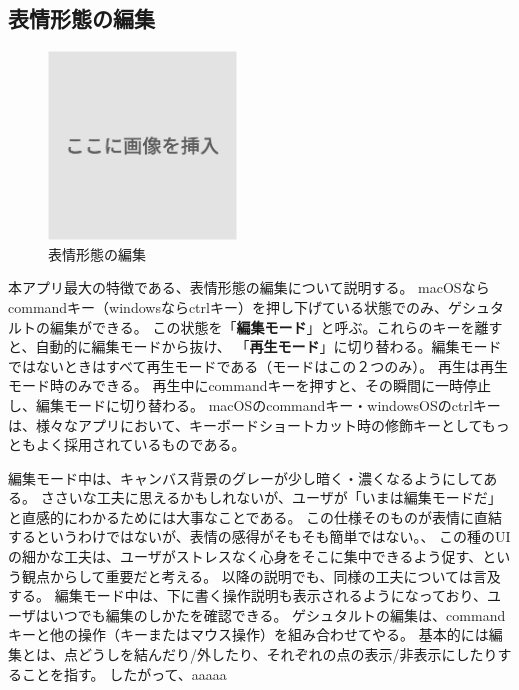 \subsection{表情形態の編集}
\begin{figure}[h]
  \centering
  \includegraphics[width=5cm]{images/dummy.png}
  \caption{表情形態の編集}
  \label{fig:表情形態の編集}
\end{figure}
本アプリ最大の特徴である、表情形態の編集について説明する。
macOSならcommandキー（windowsならctrlキー）を押し下げている状態でのみ、ゲシュタルトの編集ができる。
この状態を「\textbf{編集モード}」と呼ぶ。これらのキーを離すと、自動的に編集モードから抜け、
「\textbf{再生モード}」に切り替わる。編集モードではないときはすべて再生モードである（モードはこの２つのみ）。
再生は再生モード時のみできる。
再生中にcommandキーを押すと、その瞬間に一時停止し、編集モードに切り替わる。
macOSのcommandキー・windowsOSのctrlキーは、様々なアプリにおいて、キーボードショートカット時の修飾キーとしてもっともよく採用されているものである。

編集モード中は、キャンバス背景のグレーが少し暗く・濃くなるようにしてある。
ささいな工夫に思えるかもしれないが、ユーザが「いまは編集モードだ」と直感的にわかるためには大事なことである。
この仕様そのものが表情に直結するというわけではないが、表情の感得がそもそも簡単ではない。、
この種のUIの細かな工夫は、ユーザがストレスなく心身をそこに集中できるよう促す、という観点からして重要だと考える。
以降の説明でも、同様の工夫については言及する。
編集モード中は、下に書く操作説明も表示されるようになっており、ユーザはいつでも編集のしかたを確認できる。
ゲシュタルトの編集は、commandキーと他の操作（キーまたはマウス操作）を組み合わせてやる。
基本的には編集とは、点どうしを結んだり/外したり、それぞれの点の表示/非表示にしたりすることを指す。
したがって、aaaaa

